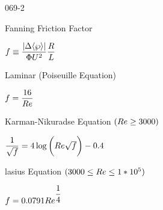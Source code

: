\begin{mitframe}{069-2}

  
\begin{listone}
\item Fanning Friction Factor

		\begin{listtwo}
        
        \item $\fug\equiv\dfrac{\vert\iipf\langle\dynpress\rangle\vert}{\diss\uvel^2}\dfrac{\gasconst}{\length}$

\end{listtwo}

\item Laminar (Poiseuille Equation)

		\begin{listtwo}
        
        \item $\fug=\dfrac{16}{\reynolds}$

\end{listtwo}

\item Karman-Nikuradse Equation $(\reynolds\geq{3000})$

		\begin{listtwo}
        
        \item $\dfrac{1}{\sqrt{\fug}}=4\log\bigg(\reynolds\sqrt{\fug}\bigg)-0.4$
        
         \end{listtwo}

\item lasius Equation $(3000\leq\reynolds\leq{1}*10^5)$

	\begin{listtwo}
        
       \item $\fug=0.0791\reynolds^{\dfrac{1}{4}}$
        

\end{listtwo}
\end{listone}
  

\end{mitframe}